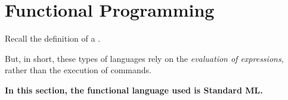\section{Functional Programming}\label{sec:Functional_Programming}
Recall the definition of a .

But, in short, these types of languages rely on the \emph{evaluation of expressions}, rather than the execution of commands.

\begin{large}
  \textbf{In this section, the functional language used is Standard ML.}
\end{large}







